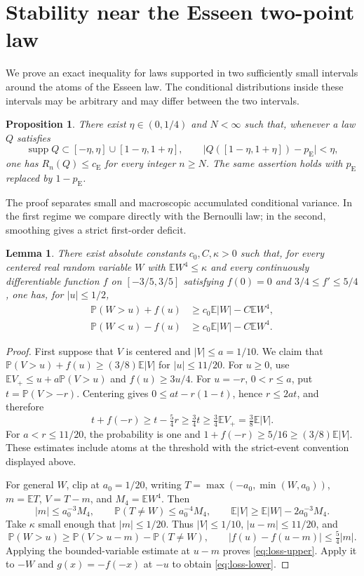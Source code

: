 \documentclass[aop]{imsart}
\theoremstyle{plain}
\newtheorem{lemma}[theorem]{Lemma}
\newtheorem{proposition}[theorem]{Proposition}
\theoremstyle{definition}
\theoremstyle{definition}
\newcommand{\PP}{\mathbb P}
\newcommand{\EE}{\mathbb E}
\newcommand{\ce}{c_{\mathrm E}}
\newcommand{\pe}{p_{\mathrm E}}
\DeclareMathOperator{\supp}{supp}
\begin{document}
\section{Stability near the Esseen two-point law}
\label{sec:clusters}

We prove an exact inequality for laws supported in two sufficiently small
intervals around the atoms of the Esseen law. The conditional distributions
inside these intervals may be arbitrary and may differ between the two
intervals.

\begin{proposition}\label{prop:clusters}
There exist $\eta\in(0,1/4)$ and $N<\infty$ such that, whenever a law $Q$
satisfies
\[
 \supp Q\subset[-\eta,\eta]\cup[1-\eta,1+\eta],\qquad
 \bigl|Q([1-\eta,1+\eta])-\pe\bigr|<\eta,
\]
one has $R_n(Q)\le\ce$ for every integer $n\ge N$.
The same assertion holds with $\pe$ replaced by $1-\pe$.
\end{proposition}

The proof separates small and macroscopic accumulated conditional
variance. In the first regime we compare directly with the Bernoulli law;
in the second, smoothing gives a strict first-order deficit.

\begin{lemma}\label{lem:one-sided-loss}
There exist absolute constants $c_0,C,\kappa>0$ such that, for every centered
real random variable $W$ with $\EE W^4\le\kappa$ and every continuously
differentiable function $f$ on $[-3/5,3/5]$ satisfying
$f(0)=0$ and $3/4\le f'\le5/4$, one has, for $|u|\le1/2$,
\begin{align}
 \PP(W>u)+f(u)&\ge c_0\EE|W|-C\EE W^4,
 \label{eq:loss-upper}\\
 \PP(W<u)-f(u)&\ge c_0\EE|W|-C\EE W^4.
 \label{eq:loss-lower}
\end{align}
\end{lemma}

\begin{proof}
First suppose that $V$ is centered and $|V|\le a=1/10$.
We claim that $\PP(V>u)+f(u)\ge(3/8)\EE|V|$ for
$|u|\le11/20$. For $u\ge0$, use
$\EE V_+\le u+a\PP(V>u)$ and $f(u)\ge3u/4$.
For $u=-r$, $0<r\le a$, put $t=\PP(V>-r)$. Centering gives
$0\le at-r(1-t)$, hence $r\le2at$, and therefore
\[
 t+f(-r)\ge t-\tfrac54r\ge\tfrac34t
 \ge\tfrac34\EE V_+=\tfrac38\EE|V|.
\]
For $a<r\le11/20$, the probability is one and
$1+f(-r)\ge5/16\ge(3/8)\EE|V|$. These estimates include atoms at
the threshold with the strict-event convention displayed above.

For general $W$, clip at $a_0=1/20$, writing
$T=\max(-a_0,\min(W,a_0))$, $m=\EE T$, $V=T-m$, and $M_4=\EE W^4$.
Then
\[
 |m|\le a_0^{-3}M_4,\qquad
 \PP(T\ne W)\le a_0^{-4}M_4,\qquad
 \EE|V|\ge\EE|W|-2a_0^{-3}M_4.
\]
Take $\kappa$ small enough that $|m|\le1/20$. Thus $|V|\le1/10$,
$|u-m|\le11/20$, and
\[
 \PP(W>u)\ge\PP(V>u-m)-\PP(T\ne W),\qquad
 |f(u)-f(u-m)|\le\tfrac54|m|.
\]
Applying the bounded-variable estimate at $u-m$ proves
\eqref{eq:loss-upper}. Apply it to $-W$ and $g(x)=-f(-x)$ at $-u$
to obtain \eqref{eq:loss-lower}.
\end{proof}
\end{document}
